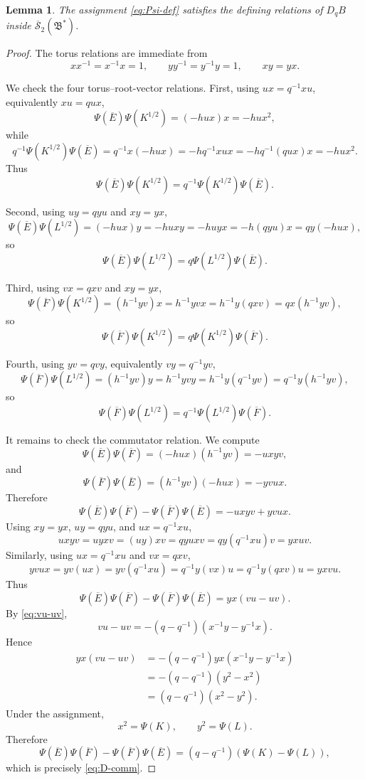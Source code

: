 \documentclass[12pt]{article}
\theoremstyle{plain}
\newtheorem{lemma}[theorem]{Lemma}
\theoremstyle{definition}
\numberwithin{equation}{section}
\newcommand{\bigon}{\mathfrak{B}^{*}}
\newcommand{\hS}{\overline{\mathscr{S}}}
\newcommand{\DqB}{D_qB}
\newcommand{\Khalf}{K^{1/2}}
\newcommand{\Lhalf}{L^{1/2}}
\newcommand{\Ebar}{\overline{E}}
\newcommand{\Fbar}{\overline{F}}
\begin{document}
\begin{lemma}\label{lem:psi-respects}
The assignment \eqref{eq:Psi-def} satisfies the defining relations of \(\DqB\) inside \(\hS_2(\bigon)\).
\end{lemma}

\begin{proof}
The torus relations are immediate from
\[
x x^{-1}=x^{-1}x=1,
\qquad
y y^{-1}=y^{-1}y=1,
\qquad
xy=yx.
\]

We check the four torus--root-vector relations.  First, using \(u x=q^{-1}x u\), equivalently \(x u=q u x\),
\[
\Psi(\Ebar)\Psi(\Khalf)
=
(-h u x)x
=
-h u x^2,
\]
while
\[
q^{-1}\Psi(\Khalf)\Psi(\Ebar)
=
q^{-1}x(-h u x)
=
-h q^{-1}x u x
=
-h q^{-1}(q u x)x
=
-h u x^2.
\]
Thus
\[
\Psi(\Ebar)\Psi(\Khalf)
=
q^{-1}\Psi(\Khalf)\Psi(\Ebar).
\]

Second, using \(u y=q y u\) and \(xy=yx\),
\[
\Psi(\Ebar)\Psi(\Lhalf)
=
(-h u x)y
=
-h u x y
=
-h u y x
=
-h(q y u)x
=
q y(-h u x),
\]
so
\[
\Psi(\Ebar)\Psi(\Lhalf)
=
q\Psi(\Lhalf)\Psi(\Ebar).
\]

Third, using \(v x=q x v\) and \(xy=yx\),
\[
\Psi(\Fbar)\Psi(\Khalf)
=
(h^{-1}y v)x
=
h^{-1}y v x
=
h^{-1}y(q x v)
=
q x(h^{-1}y v),
\]
so
\[
\Psi(\Fbar)\Psi(\Khalf)
=
q\Psi(\Khalf)\Psi(\Fbar).
\]

Fourth, using \(y v=q v y\), equivalently \(v y=q^{-1}y v\),
\[
\Psi(\Fbar)\Psi(\Lhalf)
=
(h^{-1}y v)y
=
h^{-1}y v y
=
h^{-1}y(q^{-1}y v)
=
q^{-1}y(h^{-1}y v),
\]
so
\[
\Psi(\Fbar)\Psi(\Lhalf)
=
q^{-1}\Psi(\Lhalf)\Psi(\Fbar).
\]

It remains to check the commutator relation.  We compute
\[
\Psi(\Ebar)\Psi(\Fbar)
=
(-h u x)(h^{-1}y v)
=
-u x y v,
\]
and
\[
\Psi(\Fbar)\Psi(\Ebar)
=
(h^{-1}y v)(-h u x)
=
-y v u x.
\]
Therefore
\[
\Psi(\Ebar)\Psi(\Fbar)-\Psi(\Fbar)\Psi(\Ebar)
=
-u x y v+y v u x.
\]
Using \(xy=yx\), \(u y=q y u\), and \(u x=q^{-1}x u\),
\[
u x y v
=
u y x v
=
(u y)x v
=
q y u x v
=
q y(q^{-1}x u)v
=
y x u v.
\]
Similarly, using \(u x=q^{-1}x u\) and \(v x=q x v\),
\[
y v u x
=
y v(u x)
=
y v(q^{-1}x u)
=
q^{-1}y(v x)u
=
q^{-1}y(q x v)u
=
y x v u.
\]
Thus
\[
\Psi(\Ebar)\Psi(\Fbar)-\Psi(\Fbar)\Psi(\Ebar)
=
y x(v u-u v).
\]
By \eqref{eq:vu-uv},
\[
v u-u v=-(q-q^{-1})(x^{-1}y-y^{-1}x).
\]
Hence
\[
\begin{aligned}
y x(v u-u v)
&=
-(q-q^{-1})y x(x^{-1}y-y^{-1}x)\\
&=
-(q-q^{-1})(y^2-x^2)\\
&=
(q-q^{-1})(x^2-y^2).
\end{aligned}
\]
Under the assignment,
\[
x^2=\Psi(K),
\qquad
y^2=\Psi(L).
\]
Therefore
\[
\Psi(\Ebar)\Psi(\Fbar)-\Psi(\Fbar)\Psi(\Ebar)
=
(q-q^{-1})(\Psi(K)-\Psi(L)),
\]
which is precisely \eqref{eq:D-comm}.
\end{proof}
\end{document}
